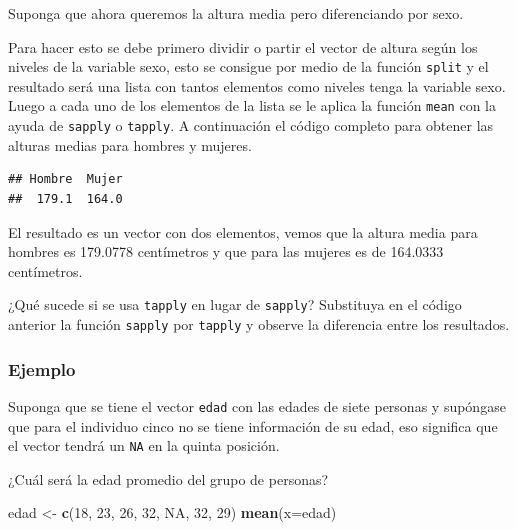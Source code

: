 \documentclass[10pt,]{krantz}
\makeatletter
\newenvironment{Shaded}{\begin{snugshade}}{\end{snugshade}}
\newcommand{\KeywordTok}[1]{\textcolor[rgb]{0.13,0.29,0.53}{\textbf{#1}}}
\newcommand{\DataTypeTok}[1]{\textcolor[rgb]{0.13,0.29,0.53}{#1}}
\newcommand{\DecValTok}[1]{\textcolor[rgb]{0.00,0.00,0.81}{#1}}
\newcommand{\StringTok}[1]{\textcolor[rgb]{0.31,0.60,0.02}{#1}}
\newcommand{\OtherTok}[1]{\textcolor[rgb]{0.56,0.35,0.01}{#1}}
\newcommand{\OperatorTok}[1]{\textcolor[rgb]{0.81,0.36,0.00}{\textbf{#1}}}
\newcommand{\NormalTok}[1]{#1}
\newenvironment{kframe}{%
\medskip{}
\setlength{\fboxsep}{.8em}
 \def\at@end@of@kframe{}%
 \ifinner\ifhmode%
  \def\at@end@of@kframe{\end{minipage}}%
  \begin{minipage}{\columnwidth}%
 \fi\fi%
 \def\FrameCommand##1{\hskip\@totalleftmargin \hskip-\fboxsep
 \colorbox{shadecolor}{##1}\hskip-\fboxsep
     \hskip-\linewidth \hskip-\@totalleftmargin \hskip\columnwidth}%
 \MakeFramed {\advance\hsize-\width
   \@totalleftmargin\z@ \linewidth\hsize
   \@setminipage}}%
 {\par\unskip\endMakeFramed%
 \at@end@of@kframe}
\renewenvironment{Shaded}{\begin{kframe}}{\end{kframe}}
\makeatother
\begin{document}
Suponga que ahora queremos la altura media pero diferenciando por sexo.

Para hacer esto se debe primero dividir o partir el vector de altura
según los niveles de la variable sexo, esto se consigue por medio de la
función \texttt{split} y el resultado será una lista con tantos
elementos como niveles tenga la variable sexo. Luego a cada uno de los
elementos de la lista se le aplica la función \texttt{mean} con la ayuda
de \texttt{sapply} o \texttt{tapply}. A continuación el código completo
para obtener las alturas medias para hombres y mujeres.

\begin{Shaded}
\end{Shaded}

\begin{verbatim}
## Hombre  Mujer 
##  179.1  164.0
\end{verbatim}

El resultado es un vector con dos elementos, vemos que la altura media
para hombres es 179.0778 centímetros y que para las mujeres es de
164.0333 centímetros.

¿Qué sucede si se usa \texttt{tapply} en lugar de \texttt{sapply}?
Substituya en el código anterior la función \texttt{sapply} por
\texttt{tapply} y observe la diferencia entre los resultados.

\subsubsection*{Ejemplo}\label{ejemplo-17}

Suponga que se tiene el vector \texttt{edad} con las edades de siete
personas y supóngase que para el individuo cinco no se tiene información
de su edad, eso significa que el vector tendrá un \texttt{NA} en la
quinta posición.

¿Cuál será la edad promedio del grupo de personas?

\begin{Shaded}
\begin{Highlighting}[]
\NormalTok{edad <-}\StringTok{ }\KeywordTok{c}\NormalTok{(}\DecValTok{18}\NormalTok{, }\DecValTok{23}\NormalTok{, }\DecValTok{26}\NormalTok{, }\DecValTok{32}\NormalTok{, }\OtherTok{NA}\NormalTok{, }\DecValTok{32}\NormalTok{, }\DecValTok{29}\NormalTok{)}
\KeywordTok{mean}\NormalTok{(}\DataTypeTok{x=}\NormalTok{edad)}
\end{Highlighting}
\end{Shaded}
\end{document}
